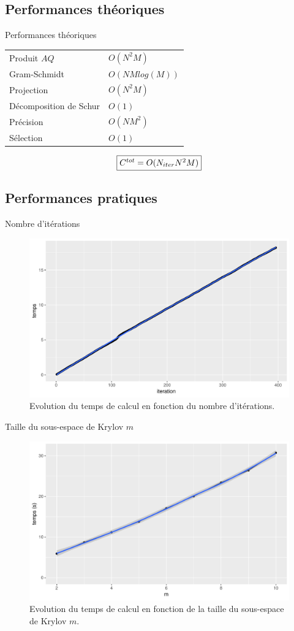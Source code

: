 \documentclass[9.5pt]{beamer}
\begin{document}
	\subsection{Performances théoriques}
		\begin{frame}{Performances théoriques}
			\begin{tabular}{ l l }
				Produit $AQ$ & $O(N^2M)$ \\
				Gram-Schmidt & $O(NMlog(M))$ \\
				Projection & $O(N^2M)$ \\
				Décomposition de Schur & $O(1)$ \\
				Précision & $O(NM^2)$ \\
				Sélection & $O(1)$ \\
			\end{tabular}

			
			$$
			\fbox{$C^{tot} = O(N_{iter}N^2M)$}
			$$
		\end{frame}

	\subsection{Performances pratiques}
		\begin{frame}{Nombre d'itérations}
			\begin{figure}
				\centering
				\includegraphics[width = 0.7\linewidth]{../rapport/plots/tvsiter.pdf}
				\caption{Evolution du temps de calcul en fonction du nombre d'itérations. \label{fig:tvsiter}}
			\end{figure}
		\end{frame}

		\begin{frame}{Taille du sous-espace de Krylov $m$}
			\begin{figure}
				\centering
				\includegraphics[width = 0.7\linewidth]{../rapport/plots/tvsm.pdf}
				\caption{Evolution du temps de calcul en fonction de la taille du sous-espace de Krylov $m$. \label{fig:tvsm}}
			\end{figure}
		\end{frame}
\end{document}
